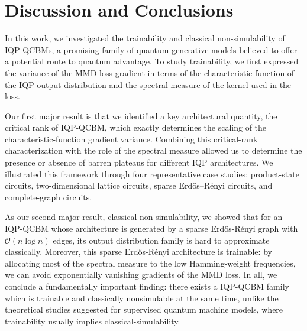 \documentclass{article}
\theoremstyle{plain}
\theoremstyle{definition}
\theoremstyle{remark}
\newcommand{\MMD}{\ensuremath{\mathrm{MMD}}\xspace}
\begin{document}


\section{Discussion and Conclusions}
\label{sec:conclusion}
In this work, we investigated the trainability and classical non-simulability of IQP-QCBMs, a promising family of quantum generative models believed to offer a potential route to quantum advantage. To study trainability, we first expressed the variance of the MMD-loss gradient in terms of the characteristic function of the IQP output distribution and the spectral measure of the kernel used in the loss. 

Our first major result is that we identified a key architectural quantity, the critical rank of IQP-QCBM, which exactly determines the scaling of the characteristic-function gradient variance. Combining this critical-rank characterization with the role of the spectral measure allowed us to determine the presence or absence of barren plateaus for different IQP architectures. We illustrated this framework through four representative case studies: product-state circuits, two-dimensional lattice circuits, sparse Erdős–Rényi circuits, and complete-graph circuits.

As our second major result, classical non-simulability, we showed that for an IQP-QCBM whose architecture is generated by a sparse Erd\H os-R\'enyi graph with $\mathcal{O}(n\log n)$ edges, its output distribution family is hard to approximate classically. Moreover, this sparse Erd\H os-R\'enyi architecture is trainable: by allocating most of the spectral measure to the low Hamming-weight frequencies, we can avoid exponentially vanishing gradients of the MMD loss.  In all, we conclude a fundamentally important finding: there exists a IQP-QCBM family which is trainable and classically nonsimulable at the same time, unlike the theoretical studies suggested for supervised quantum machine models, where trainability usually implies classical-simulability.
\end{document}

